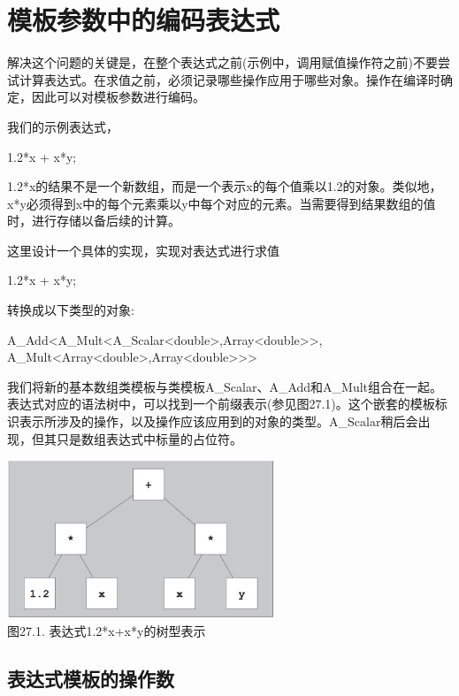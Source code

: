 \section{模板参数中的编码表达式}

解决这个问题的关键是，在整个表达式之前(示例中，调用赋值操作符之前)不要尝试计算表达式。在求值之前，必须记录哪些操作应用于哪些对象。操作在编译时确定，因此可以对模板参数进行编码。

我们的示例表达式，

\begin{cpp}
1.2*x + x*y;
\end{cpp}

1.2*x的结果不是一个新数组，而是一个表示x的每个值乘以1.2的对象。类似地，x*y必须得到x中的每个元素乘以y中每个对应的元素。当需要得到结果数组的值时，进行存储以备后续的计算。

这里设计一个具体的实现，实现对表达式进行求值

\begin{cpp}
1.2*x + x*y;
\end{cpp}

转换成以下类型的对象:

\begin{cpp}
A_Add<A_Mult<A_Scalar<double>,Array<double>>,
	  A_Mult<Array<double>,Array<double>>>
\end{cpp}

我们将新的基本数组类模板与类模板A\_Scalar、A\_Add和A\_Mult组合在一起。表达式对应的语法树中，可以找到一个前缀表示(参见图27.1)。这个嵌套的模板标识表示所涉及的操作，以及操作应该应用到的对象的类型。A\_Scalar稍后会出现，但其只是数组表达式中标量的占位符。

\begin{center}
\includegraphics[width=0.6\textwidth]{part3/ch27/images/1.png} \\
图27.1. 表达式1.2*x+x*y的树型表示
\end{center}

\subsection{表达式模板的操作数}

